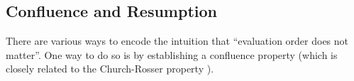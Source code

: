 

\subsection{Confluence and Resumption}\label{sec:confluence}
There are various ways to encode the intuition that ``evaluation order does not matter''. One way to do so is
by establishing a confluence property (which is closely related to
the Church-Rosser property \cite{church1936some}).

